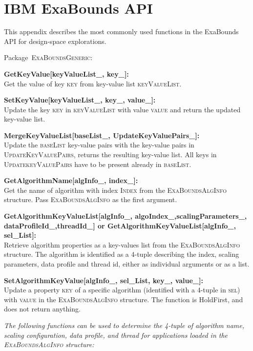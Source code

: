 \section{IBM ExaBounds API}

This appendix describes the most commonly used functions in the ExaBounds API for design-space explorations.

\newcommand*{\call}[2]{\par\noindent\textbf{#1:}\\#2\vspace{5pt}}
\newcommand*{\package}[1]{\vspace{10pt}\par\noindent Package~\textsc{#1}:\vspace{10pt}}

\package{ExaBoundsGeneric}

\call{GetKeyValue[keyValueList\_, key\_]}{Get the value of key \textsc{key} from key-value list \textsc{keyValueList}.}
\call{SetKeyValue[keyValueList\_, key\_, value\_]}{Update the key \textsc{key} in \textsc{keyValueList} with value \textsc{value} and return the updated key-value list.}
\call{MergeKeyValueList[baseList\_, UpdateKeyValuePairs\_]}{Update the \textsc{baseList} key-value pairs with the key-value pairs in \textsc{UpdateKeyValuePairs}, returns the resulting key-value list. All keys in \textsc{UpdatekeyValuePairs} have to be present already in \textsc{baseList}.}
\call{GetAlgorithmName[algInfo\_, index\_]}{Get the name of algorithm with index \textsc{Index} from the \textsc{ExaBoundsAlgInfo} structure. Pass \textsc{ExaBoundsAlgInfo} as the first argument.}
\call{GetAlgorithmKeyValueList[algInfo\_, algoIndex\_,scalingParameters\_, dataProfileId\_,threadId\_] or GetAlgorithmKeyValueList[algInfo\_, sel\_List]}{Retrieve algorithm properties as a key-values list from the \textsc{ExaBoundsAlgInfo} structure. The algorithm is identified as a 4-tuple describing the index, scaling parameters, data profile and thread id, either as individual arguments or as a list.}
\call{SetAlgorithmKeyValue[algInfo\_, sel\_List, key\_, value\_]}{Update a property \textsc{key} of a specific algorithm (identified with a 4-tuple in \textsc{sel}) with \textsc{value} in the \textsc{ExaBoundsAlgInfo} structure. The function is HoldFirst, and does not return anything.}

\textit{The following functions can be used to determine the 4-tuple of algorithm name, scaling configuration, data profile, and thread for applications loaded in the \textsc{ExaBoundsAlgInfo} structure:}\newline

